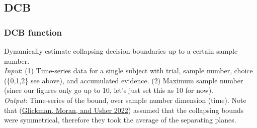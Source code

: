 \documentclass[
]{book}
\begin{document}
\hypertarget{dcb-1}{%
\subsection{DCB}\label{dcb-1}}

\hypertarget{dcb-function}{%
\subsubsection*{DCB function}\label{dcb-function}}

Dynamically estimate collapsing decision boundaries up to a certain sample number.\\
\emph{Input}: (1) Time-series data for a single subject with trial, sample number, choice (\{0,1,2\} see above), and accumulated evidence. (2) Maximum sample number (since our figures only go up to 10, let's just set this as 10 for now).\\
\emph{Output}: Time-series of the bound, over sample number dimension (time). Note that (\protect\hyperlink{ref-glickman2022}{Glickman, Moran, and Usher 2022}) assumed that the collapsing bounds were symmetrical, therefore they took the average of the separating planes.
\end{document}

